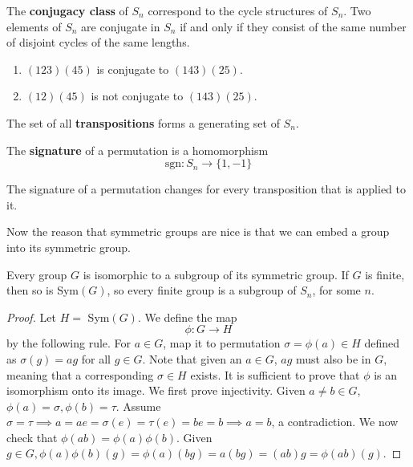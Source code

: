   \begin{definition}
    The \textbf{conjugacy class} of $S_{n}$ correspond to the cycle structures of $S_{n}$. Two elements of $S_{n}$ are conjugate in $S_{n}$ if and only if they consist of the same number of disjoint cycles of the same lengths. 
  \end{definition} 

  \begin{example}
    \begin{enumerate}
      \item $(1 2 3) (4 5)$ is conjugate to $(1 4 3) (2 5)$.
      \item $(1 2) (4 5)$ is not conjugate to $(1 4 3) (2 5)$. 
    \end{enumerate}
  \end{example}

  \begin{theorem}[Transpositions]
    The set of all \textbf{transpositions} forms a generating set of $S_{n}$. 
  \end{theorem}

  \begin{definition}
    The \textbf{signature} of a permutation is a homomorphism
    \begin{equation}
      \text{sgn}: S_{n} \longrightarrow \{1, -1\}
    \end{equation}
  \end{definition}

  \begin{lemma}
    The signature of a permutation changes for every transposition that is applied to it. 
  \end{lemma}

  Now the reason that symmetric groups are nice is that we can embed a group into its symmetric group.  

  \begin{theorem}
    Every group $G$ is isomorphic to a subgroup of its symmetric group. If $G$ is finite, then so is Sym$(G)$, so every finite group is a subgroup of $S_{n}$, for some $n$.
  \end{theorem}
  \begin{proof}
    Let $H =$ Sym$(G)$. We define the map
    \begin{equation}
      \phi: G \longrightarrow H
    \end{equation}
    by the following rule. For $a \in G$, map it to permutation $\sigma = \phi (a) \in H$ defined as $\sigma(g) = a g$ for all $g \in G$. Note that given an $a \in G$, $a g$ must also be in $G$, meaning that a corresponding $\sigma \in H$ exists. It is sufficient to prove that $\phi$ is an isomorphism onto its image. We first prove injectivity. Given $a \neq b \in G$, $\phi(a)=\sigma, \phi(b) = \tau$. Assume $\sigma = \tau \implies a = a e =  \sigma(e) = \tau (e) = b e = b \implies a = b$, a contradiction. We now check that $\phi(a b) = \phi(a) \phi(b)$. Given $g \in G, \phi(a) \phi(b) (g) = \phi(a) (bg) = a(bg)= (ab) g = \phi(ab) (g).$
  \end{proof}

